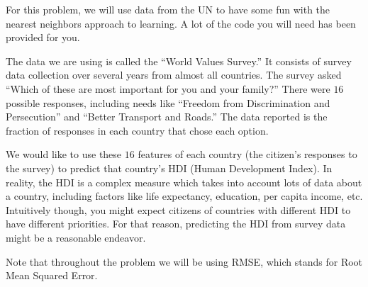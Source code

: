 \documentclass[preview]{standalone}
\begin{document}

For this problem, we will use data from the UN to have some fun with the nearest neighbors approach to learning. A lot of the code you will need has been provided for you.

The data we are using is called the ``World Values Survey.'' It consists of survey data collection over several years from almost all countries. The survey asked ``Which of these are most important for you and your family?'' There were $16$ possible responses, including needs like ``Freedom from Discrimination and Persecution'' and ``Better Transport and Roads.'' The data reported is the fraction of responses in each country that chose each option.

We would like to use these $16$ features of each country (the citizen's responses to the survey) to predict that country's HDI (Human Development Index). In reality, the HDI is a complex measure which takes into account lots of data about a country, including factors like life expectancy, education, per capita income, etc. Intuitively though, you might expect citizens of countries with different HDI to have different priorities. For that reason, predicting the HDI from survey data might be a reasonable endeavor.

Note that throughout the problem we will be using RMSE, which stands for Root Mean Squared Error.
\end{document}
